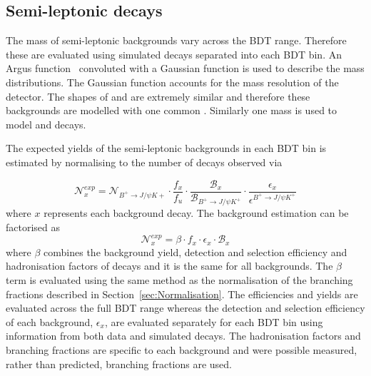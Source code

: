 {%

\subsection{Semi-leptonic decays}%
The mass \pdfs of semi-leptonic backgrounds vary across the BDT range. Therefore these \pdfs are evaluated using simulated decays separated into each BDT bin. An Argus function~\cite{Argus_pdf} convoluted with a Gaussian function is used to describe the mass distributions. The Gaussian function accounts for the mass resolution of the detector. The shapes of \bdpimunu and \bsKmunu are extremely similar and therefore these backgrounds are modelled with one common \pdf. Similarly one mass \pdf is used to model \bupimumu and \bdpimumu decays.

The expected yields of the semi-leptonic backgrounds in each BDT bin is estimated by normalising to the number of \bujpsik decays observed via

\begin{equation}
\mathcal{N}^{exp}_{x} = \mathcal{N}_{B^{+} \to J/\psi K{+}} \cdot \frac{f_{x}}{f_{u}} \cdot \frac{\mathcal{B}_{x}}{\mathcal{B}_{B^{+} \to J/\psi K^{+}}} \cdot \frac{\epsilon_{x}}{\epsilon^{B^{+} \to J/\psi K^{+}}} 
\label{eq:BkgndPredict}
\end{equation}
where $x$ represents each background decay. The background estimation can be factorised as
\begin{equation}
\mathcal{N}^{exp}_{x} = \beta \cdot f_{x} \cdot \epsilon_{x} \cdot \mathcal{B}_{x}
\label{eq:BkgndPredict2}
\end{equation}
where $\beta$ combines the background yield, detection and selection efficiency and hadronisation factors of \bujpsik decays and it is the same for all backgrounds. The $\beta$ term is evaluated using the same method as the normalisation of the \bmumu branching fractions described in Section~\ref{sec:Normalisation}. The \bujpsik efficiencies and yields are evaluated across the full BDT range whereas the detection and selection efficiency of each background, $ \epsilon_{x}$, are evaluated separately for each BDT bin using information from both data and simulated decays. The hadronisation factors and branching fractions are specific to each background and were possible measured, rather than predicted, branching fractions are used. %

}
